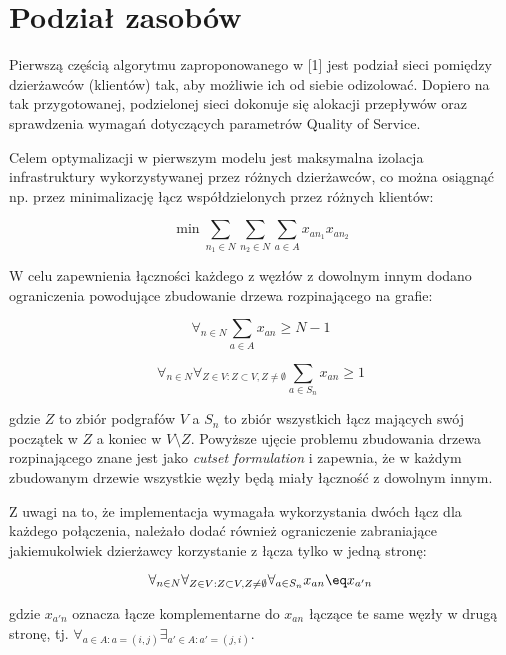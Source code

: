 \section{Podział zasobów}

Pierwszą częścią algorytmu zaproponowanego w [1] jest podział sieci pomiędzy dzierżawców (klientów) tak, aby możliwie ich od siebie odizolować. Dopiero na tak przygotowanej, podzielonej sieci dokonuje się alokacji przepływów oraz sprawdzenia wymagań dotyczących parametrów Quality of Service. \newline

Celem optymalizacji w pierwszym modelu jest maksymalna izolacja infrastruktury wykorzystywanej przez różnych dzierżawców, co można osiągnąć np. przez minimalizację łącz współdzielonych przez różnych klientów:

\begin{equation}
  \min \sum_{n_{1} \in N} \sum_{n_{2} \in N} \sum_{a \in A} x_{an_{1}} x_{an_{2}}
\end{equation}

W celu zapewnienia łączności każdego z węzłów z dowolnym innym dodano ograniczenia powodujące zbudowanie drzewa rozpinającego na grafie:

\begin{equation}
  \forall_{n \in N} \sum_{a \in A} x_{an} \ge N-1
\end{equation}

\begin{equation}
  \forall_{n \in N} \forall_{Z \in V: Z \subset V, Z \neq \emptyset } \sum_{a \in S_{n}} x_{an} \ge 1
\end{equation}

gdzie $Z$ to zbiór podgrafów $V$ a $S_{n}$ to zbiór wszystkich łącz mających swój początek w $Z$ a koniec w $V \setminus Z$. Powyższe ujęcie problemu zbudowania drzewa rozpinającego znane jest jako \textit{cutset formulation} i zapewnia, że w każdym zbudowanym drzewie wszystkie węzły będą miały łączność z dowolnym innym.

Z uwagi na to, że implementacja wymagała wykorzystania dwóch łącz dla każdego połączenia, należało dodać również ograniczenie zabraniające jakiemukolwiek dzierżawcy korzystanie z łącza tylko w jedną stronę:

\begin{equation}
  \forall_{n \in N} \forall_{Z \in V: Z \subset V, Z \neq \emptyset } \forall_{a \in S_{n}} x_{an} \eq x_{a'n}
\end{equation}

gdzie $x_{a'n}$ oznacza łącze komplementarne do $x_{an}$ łączące te same węzły w drugą stronę, tj. $\forall_{a \in A: a = (i,j)} \exists_{a' \in A: a' = (j,i)}$.
